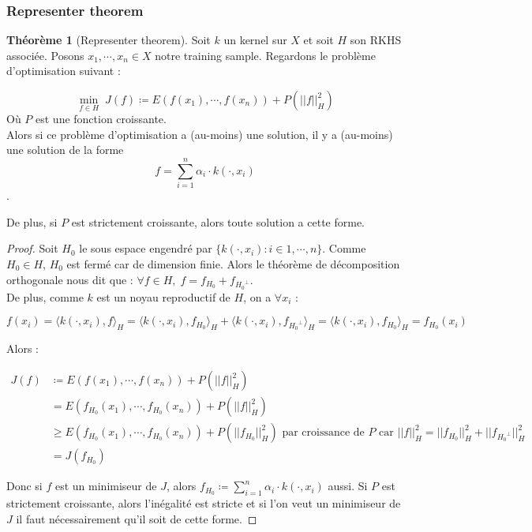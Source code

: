 \documentclass[a4paper, 11pt, french]{article}
\theoremstyle{definition}
\newtheorem{theorem}{Théorème}
\begin{document}
	\subsubsection{Representer theorem}
	
	\begin{theorem}[Representer theorem]
		Soit $k$ un kernel sur $X$ et soit $H$ son RKHS associée. Posons $x_1, \cdots, x_n \in X$ notre training sample. Regardons le problème d'optimisation suivant :
		
		\[\min_{f \in H} \; J(f) \coloneqq E(f(x_1), \cdots, f(x_n)) + P(||f||_H^2)\]
		Où $P$ est une fonction croissante. \\
		
		Alors si ce problème d'optimisation a (au-moins) une solution, il y a (au-moins) une solution de la forme \[f = \sum_{i=1}^{n} \alpha_i \cdot k(\cdot, x_i)\].
		
		De plus, si $P$ est strictement croissante, alors toute solution a cette forme.
	\end{theorem}
	\begin{proof}
		Soit $H_0$ le sous espace engendré par $\{k(\cdot, x_i ) : i \in 1, \cdots, n\}$. Comme $H_0 \in H$, $H_0$ est fermé car de dimension finie. Alors le théorème de décomposition orthogonale nous dit que : $\forall f \in H, \; f = f_{H_0} + f_{{H_0}^\perp}$. \\
		
		De plus, comme $k$ est un noyau reproductif de $H$, on a $\forall x_i$ :
		
		\[f(x_i) = \langle k(\cdot, x_i), f \rangle_H = \langle k(\cdot, x_i), f_{H_0} \rangle_H + \langle k(\cdot, x_i), f_{{H_0}^\perp} \rangle_H = \langle k(\cdot, x_i), f_{H_0} \rangle_H = f_{H_0} (x_i) \]
		
		Alors :
		
		\begin{align*}
			J(f) &\coloneqq E(f(x_1), \cdots, f(x_n)) + P(||f||_H^2) \\
			&= E(f_{H_0}(x_1), \cdots, f_{H_0}(x_n)) + P(||f||_H^2) \\
			&\geq E(f_{H_0}(x_1), \cdots, f_{H_0}(x_n)) + P(||f_{H_0}||_H^2) \text{ par croissance de $P$ car $||f||_H^2 = ||f_{H_0}||_H^2 + ||f_{{H_0}^\perp}||_H^2$}\\
			&= J(f_{H_0})
		\end{align*}
	
		Donc si $f$ est un minimiseur de $J$, alors $f_{H_0} \coloneqq \sum_{i=1}^{n} \alpha_i \cdot k(\cdot, x_i)$ aussi. Si $P$ est strictement croissante, alors l'inégalité est stricte et si l'on veut un minimiseur de $J$ il faut nécessairement qu'il soit de cette forme.
	\end{proof}
\end{document}
